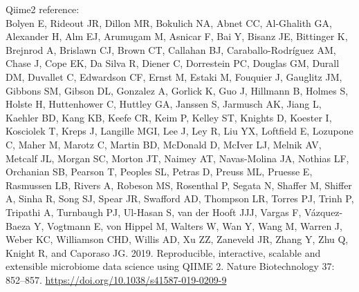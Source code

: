 \documentclass[
]{book}
\begin{document}
Qiime2 reference:\\
Bolyen E, Rideout JR, Dillon MR, Bokulich NA, Abnet CC, Al-Ghalith GA, Alexander H, Alm EJ, Arumugam M, Asnicar F, Bai Y, Bisanz JE, Bittinger K, Brejnrod A, Brislawn CJ, Brown CT, Callahan BJ, Caraballo-Rodríguez AM, Chase J, Cope EK, Da Silva R, Diener C, Dorrestein PC, Douglas GM, Durall DM, Duvallet C, Edwardson CF, Ernst M, Estaki M, Fouquier J, Gauglitz JM, Gibbons SM, Gibson DL, Gonzalez A, Gorlick K, Guo J, Hillmann B, Holmes S, Holste H, Huttenhower C, Huttley GA, Janssen S, Jarmusch AK, Jiang L, Kaehler BD, Kang KB, Keefe CR, Keim P, Kelley ST, Knights D, Koester I, Kosciolek T, Kreps J, Langille MGI, Lee J, Ley R, Liu YX, Loftfield E, Lozupone C, Maher M, Marotz C, Martin BD, McDonald D, McIver LJ, Melnik AV, Metcalf JL, Morgan SC, Morton JT, Naimey AT, Navas-Molina JA, Nothias LF, Orchanian SB, Pearson T, Peoples SL, Petras D, Preuss ML, Pruesse E, Rasmussen LB, Rivers A, Robeson MS, Rosenthal P, Segata N, Shaffer M, Shiffer A, Sinha R, Song SJ, Spear JR, Swafford AD, Thompson LR, Torres PJ, Trinh P, Tripathi A, Turnbaugh PJ, Ul-Hasan S, van der Hooft JJJ, Vargas F, Vázquez-Baeza Y, Vogtmann E, von Hippel M, Walters W, Wan Y, Wang M, Warren J, Weber KC, Williamson CHD, Willis AD, Xu ZZ, Zaneveld JR, Zhang Y, Zhu Q, Knight R, and Caporaso JG. 2019. Reproducible, interactive, scalable and extensible microbiome data science using QIIME 2. Nature Biotechnology 37: 852--857. \url{https://doi.org/10.1038/s41587-019-0209-9}

  
\end{document}
